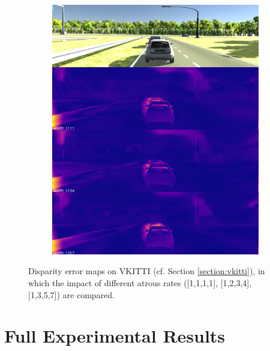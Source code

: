 \begin{figure}[h!]
\begin{subfigure}[c]{0.24\textwidth}
\end{subfigure}
\begin{subfigure}[c]{0.24\textwidth}
\includegraphics[width=\textwidth]{images/visual_comparisons/aspp-rates-vkitti/concat_2083.png}
\end{subfigure}
\caption{Disparity error maps on VKITTI (cf. Section \ref{section:vkitti}), in which the impact of different atrous rates ([1,1,1,1], [1,2,3,4], [1,3,5,7]) are compared.}
\label{fig:appendix:vkitti}
\end{figure}


\section{Full Experimental Results}\label{appendix:full-results}
\setcounter{figure}{0}    

